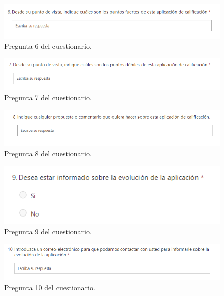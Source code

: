 \begin{figure}[h]
\centering\includegraphics[width=0.5\linewidth]{figs/pregunta_6.png}
\caption{Pregunta 6 del cuestionario.}
\label{Fig:pregunta_6}
\end{figure}

\begin{figure}[h]
\centering\includegraphics[width=0.5\linewidth]{figs/pregunta_7.png}
\caption{Pregunta 7 del cuestionario.}
\label{Fig:pregunta_7}
\end{figure}

\begin{figure}[h]
\centering\includegraphics[width=0.5\linewidth]{figs/pregunta_8.png}
\caption{Pregunta 8 del cuestionario.}
\label{Fig:pregunta_8}
\end{figure}

\begin{figure}[h]
\centering\includegraphics[width=0.5\linewidth]{figs/pregunta_9.png}
\caption{Pregunta 9 del cuestionario.}
\label{Fig:pregunta_9}
\end{figure}

\begin{figure}[h]
\centering\includegraphics[width=1\linewidth]{figs/pregunta_10.png}
\caption{Pregunta 10 del cuestionario.}
\label{Fig:pregunta_10}
\end{figure}
\newpage